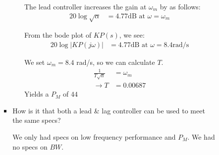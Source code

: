 \begin{enumerate}
\begin{enumerate}
\begin{enumerate}
\begin{itemize}
\begin{enumerate}
                                        The lead controller increases the gain at $\omega_m$ by as follows:
                                        \begin{align*}
                                            20 \log\sqrt{\alpha} &= 4.77 \text{dB at } \omega = \omega_m
                                        \end{align*}

                                        From the bode plot of $KP(s)$, we see:
                                        \begin{align*}
                                            20 \log{|KP(j\omega)|} &= 4.77 \text{dB at } \omega = 8.4 \text{rad/s}
                                        \end{align*}

                                        We set $\omega_m = 8.4$ rad/s, so we can calculate $T$.
                                        \begin{align*}
                                            \frac{1}{T \sqrt{\alpha}} &= \omega_m \\
                                            \rightarrow T &= 0.00687
                                        \end{align*}
                                        Yields a $P_M$ of $44$\textdegree
                                \end{enumerate}

                            \item How is it that both a lead \& lag controller can be used to meet the same specs?

                                We only had specs on low frequency performance and $P_M$. We had no specs on $BW$.


\end{itemize}
\end{enumerate}
\end{enumerate}
\end{enumerate}
